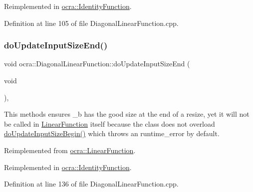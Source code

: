 Reimplemented in \hyperlink{classocra_1_1IdentityFunction_aa8d5ff0e25422b3b5a4a2a8621120790}{ocra\+::\+Identity\+Function}.



Definition at line 105 of file Diagonal\+Linear\+Function.\+cpp.

\hypertarget{classocra_1_1DiagonalLinearFunction_a8a51d23c302c9bad9579b95e29481f55}{}\label{classocra_1_1DiagonalLinearFunction_a8a51d23c302c9bad9579b95e29481f55} 
\subsubsection{\texorpdfstring{do\+Update\+Input\+Size\+End()}{doUpdateInputSizeEnd()}}
{\footnotesize\ttfamily void ocra\+::\+Diagonal\+Linear\+Function\+::do\+Update\+Input\+Size\+End (\begin{DoxyParamCaption}\item[{void}]{ }\end{DoxyParamCaption})\hspace{0.3cm}{\ttfamily [protected]}, {\ttfamily [virtual]}}

This methods ensures \+\_\+b has the good size at the end of a resize, yet it will not be called in \hyperlink{classocra_1_1LinearFunction}{Linear\+Function} itself because the class does not overload \hyperlink{classocra_1_1DiagonalLinearFunction_a2071e4c52785c88119917460b94773cb}{do\+Update\+Input\+Size\+Begin()} which throws an runtime\+\_\+error by default. 

Reimplemented from \hyperlink{classocra_1_1LinearFunction_ac6bdf62ad6634397778d5f4223ed6d82}{ocra\+::\+Linear\+Function}.



Reimplemented in \hyperlink{classocra_1_1IdentityFunction_adcfa8a32491113a590e7066f0062fbc6}{ocra\+::\+Identity\+Function}.



Definition at line 136 of file Diagonal\+Linear\+Function.\+cpp.

\hypertarget{classocra_1_1DiagonalLinearFunction_afc676bfa2611945421d73b18e2740bd0}{}\label{classocra_1_1DiagonalLinearFunction_afc676bfa2611945421d73b18e2740bd0} 
